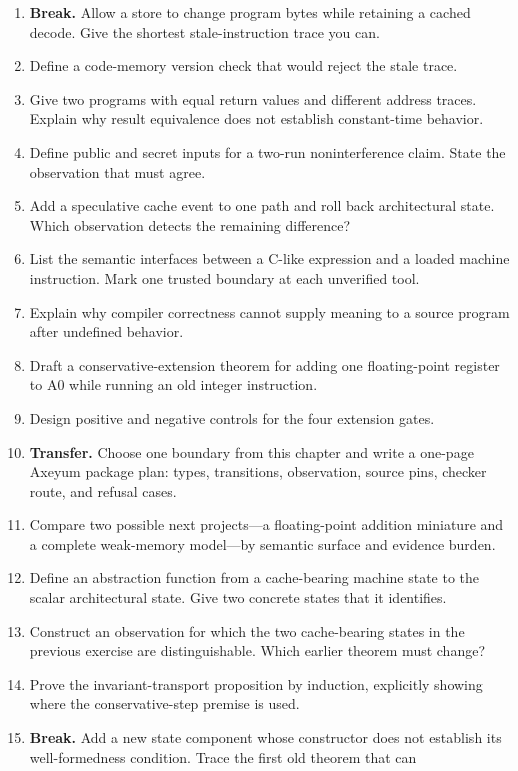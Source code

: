 \begin{enumerate}
model as an identity mapping.
\item \textbf{Break.} Allow a store to change program bytes while retaining a
cached decode. Give the shortest stale-instruction trace you can.
\item Define a code-memory version check that would reject the stale trace.
\item Give two programs with equal return values and different address traces.
Explain why result equivalence does not establish constant-time behavior.
\item Define public and secret inputs for a two-run noninterference claim. State
the observation that must agree.
\item Add a speculative cache event to one path and roll back architectural
state. Which observation detects the remaining difference?
\item List the semantic interfaces between a C-like expression and a loaded
machine instruction. Mark one trusted boundary at each unverified tool.
\item Explain why compiler correctness cannot supply meaning to a source
program after undefined behavior.
\item Draft a conservative-extension theorem for adding one floating-point
register to A0 while running an old integer instruction.
\item Design positive and negative controls for the four extension gates.
\item \textbf{Transfer.} Choose one boundary from this chapter and write a
one-page Axeyum package plan: types, transitions, observation, source pins,
checker route, and refusal cases.
\item Compare two possible next projects—a floating-point addition miniature
and a complete weak-memory model—by semantic surface and evidence burden.
\item Define an abstraction function from a cache-bearing machine state to the
scalar architectural state. Give two concrete states that it identifies.
\item Construct an observation for which the two cache-bearing states in the
previous exercise are distinguishable. Which earlier theorem must change?
\item Prove the invariant-transport proposition by induction, explicitly
showing where the conservative-step premise is used.
\item \textbf{Break.} Add a new state component whose constructor does not
establish its well-formedness condition. Trace the first old theorem that can

\end{enumerate}
